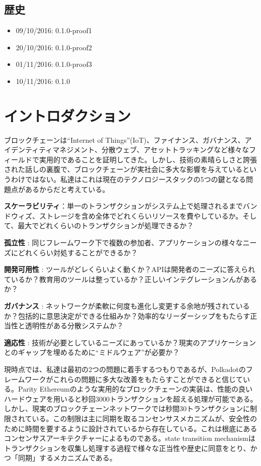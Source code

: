 \hypertarget{ux6b74ux53f2}{%
\subsection{歴史}\label{ux6b74ux53f2}}

\begin{itemize}
\tightlist
\item
  09/10/2016: 0.1.0-proof1
\item
  20/10/2016: 0.1.0-proof2
\item
  01/11/2016: 0.1.0-proof3
\item
  10/11/2016: 0.1.0
\end{itemize}

\hypertarget{ux30a4ux30f3ux30c8ux30edux30c0ux30afux30b7ux30e7ux30f3}{%
\section{イントロダクション}\label{ux30a4ux30f3ux30c8ux30edux30c0ux30afux30b7ux30e7ux30f3}}

ブロックチェーンは``Internet of
Things''(IoT)、ファイナンス、ガバナンス、アイデンティティマネジメント、分散ウェブ、アセットトラッキングなど様々なフィールドで実用的であることを証明してきた。しかし、技術の素晴らしさと誇張された話しの裏腹で、ブロックチェーンが実社会に多大な影響を与えているというわけではない。私達はこれは現在のテクノロジースタックの5つの鍵となる問題点があるからだと考えている。

\textbf{スケーラビリティ}：単一のトランザクションがシステム上で処理されるまでバンドウィズ、ストレージを含め全体でどれくらいリソースを費やしているか。そして、最大でどれくらいのトランザクションが処理できるか？

\textbf{孤立性} :
同じフレームワーク下で複数の参加者、アプリケーションの様々なニーズにどれくらい対処することができるか？

\textbf{開発可用性} :
ツールがどレくらいよく動くか？APIは開発者のニーズに答えられているか？教育用のツールは整っているか？正しいインテグレーションんがあるか？

\textbf{ガバナンス} :
ネットワークが柔軟に何度も進化し変更する余地が残されているか？包括的に意思決定ができる仕組みか？効率的なリーダーシップをもたらす正当性と透明性がある分散システムか？

\textbf{適応性} :
技術が必要としているニーズにあっているか？現実のアプリケーションとのギャップを埋めるために``ミドルウェア''が必要か？

現時点では、私達は最初の2つの問題に着手するつもりであるが、Polkadotのフレームワークがこれらの問題に多大な改善をもたらすことができると信じている。Parity
Ethereumのような実用的なブロックチェーンの実装は、性能の良いハードウェアを用いると秒回3000トランザクションを超える処理が可能である。しかし、現実のブロックチェーンネットワークでは秒間30トランザクションに制限されている。この制限は主に同期を取るコンセンサスメカニズムが、安全性のために時間を要するように設計されているから存在している。これは根底にあるコンセンサスアーキテクチャーによるものである。state
transition
mechanismはトランザクションを収集し処理する過程で様々な正当性や歴史に同意をとり、かつ「同期」するメカニズムである。

